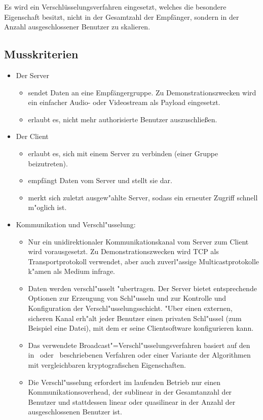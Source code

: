 \documentclass[a4paper,10pt]{scrartcl}
\begin{document}
Es wird ein Verschlüsselungsverfahren eingesetzt, welches die besondere
Eigenschaft besitzt, nicht in der Gesamtzahl der Empfänger, sondern in der Anzahl
ausgeschlossener Benutzer zu skalieren.

\subsection{Musskriterien}

\begin{itemize}

\item Der Server
\begin{itemize}
   \item sendet Daten an eine Empfängergruppe. Zu Demonstrationszwecken wird
         ein einfacher Audio- oder Videostream als Payload eingesetzt.
   \item erlaubt es, nicht mehr authorisierte Benutzer auszuschließen.
\end{itemize}

\item Der Client
\begin{itemize}
   \item erlaubt es, sich mit einem Server zu verbinden (einer Gruppe beizutreten).
   \item empfängt Daten vom Server und stellt sie dar.
   \item merkt sich zuletzt ausgew"ahlte Server, sodass ein erneuter Zugriff schnell
         m"oglich ist.
\end{itemize}

\item Kommunikation und Verschl"usselung:
\begin{itemize}
   \item Nur ein unidirektionaler Kommunikationskanal vom Server zum Client wird
         vorausgesetzt. Zu Demonstrationszwecken wird TCP als Transportprotokoll
         verwendet, aber auch zuverl"assige Multicastprotokolle k"amen als Medium
         infrage.
   \item Daten werden verschl"usselt "ubertragen. Der Server bietet entsprechende
         Optionen zur Erzeugung von Schl"usseln und zur Kontrolle und Konfiguration
         der Verschl"usselungsschicht. "Uber einen externen, sicheren Kanal erh"alt
         jeder Benutzer einen privaten Schl"ussel (zum Beispiel eine Datei), mit dem er seine
         Clientsoftware konfigurieren kann.
   \item Das verwendete Broadcast"=Verschl"usselungsverfahren basiert auf den
         in~\cite[Section~2.2]{Naor00} oder~\cite{Garg10} beschriebenen Verfahren
         oder einer Variante der Algorithmen mit vergleichbaren kryptografischen
         Eigenschaften.
   \item Die Verschl"usselung erfordert im laufenden Betrieb nur einen
         Kommunikationsoverhead, der sublinear in der Gesamtanzahl der Benutzer und
         stattdessen linear oder quasilinear in der Anzahl der ausgeschlossenen
         Benutzer ist.
\end{itemize}
\end{itemize}
\end{document}
